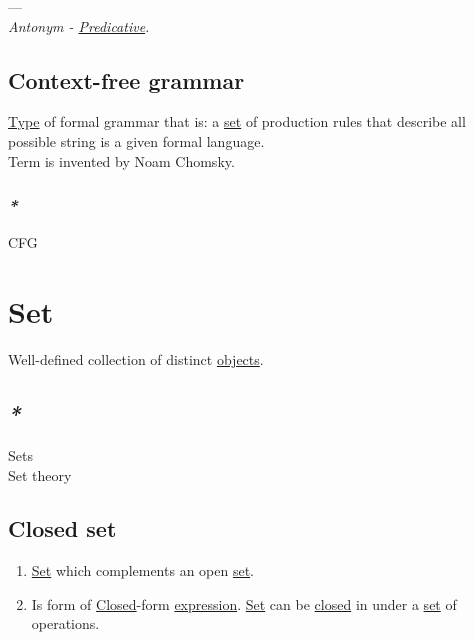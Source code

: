 \documentclass[a4paper,14pt,oneside]{book}
\begin{document}
---\\

\emph{Antonym - \hyperref[org7f269c8]{Predicative}.}\\

\section{\label{orgdf4eae5}Context-free grammar}
\label{sec:org83f70d6}
\hyperref[org33d7e2e]{Type} of formal grammar that is: a \hyperref[orgea3d2d2]{set} of production rules that describe all possible string is a given formal language.\\

Term is invented by Noam Chomsky.\\

\subsection{\emph{*}}
\label{sec:orgc3c6887}

\label{orgd287eea}CFG\\

\chapter{\label{orgea3d2d2}Set}
\label{sec:org43414ba}
Well-defined collection of distinct \hyperref[org40505eb]{objects}.\\

\section{\emph{*}}
\label{sec:org8b1d86e}

\label{org64ab7d1}Sets\\
\label{org86d78d6}Set theory\\

\section{\label{org1debfd5}Closed set}
\label{sec:orgb450c84}
\begin{enumerate}
\item \hyperref[orgea3d2d2]{Set} which complements an open \hyperref[orgea3d2d2]{set}.\\

\item Is form of \hyperref[orgd70beb6]{Closed}-form \hyperref[orgf3b860b]{expression}. \hyperref[orgea3d2d2]{Set} can be \hyperref[orgd70beb6]{closed} in under a \hyperref[orgea3d2d2]{set} of operations.\\
\end{enumerate}
\end{document}
